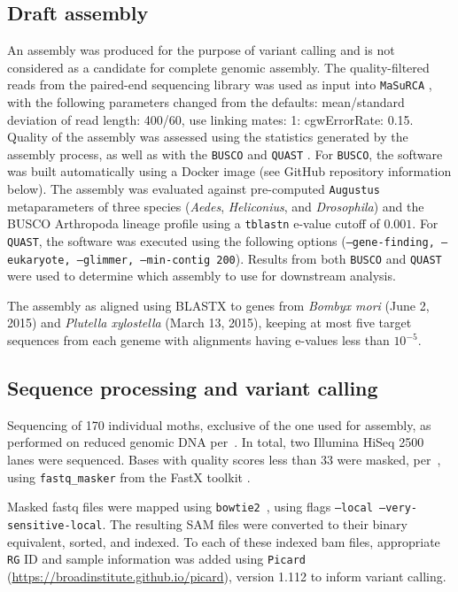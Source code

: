 \documentclass[smallextended]{svjour3}
\begin{document}
\subsection*{Draft assembly}

An assembly was produced for the purpose of variant calling and is not
considered as a candidate for complete genomic assembly. The quality-filtered
reads from the paired-end sequencing library was used as input into
\texttt{MaSuRCA} \citep[][versions 2.3.2, 3.1.3]{Zimin:2013kn}, with the
following parameters changed from the defaults: mean/standard deviation of read
length: 400/60, use linking mates: 1: cgwErrorRate: 0.15.  Quality of the
assembly was assessed using the statistics generated by the assembly process, as
well as with the \texttt{BUSCO} \citep[][version 1.1b1]{Simao:2015kk} and
\texttt{QUAST} \citep[][version 3.2]{Gurevich:2013je}. For \texttt{BUSCO}, the
software was built automatically using a Docker image (see GitHub repository
information below). The assembly was evaluated against pre-computed
\texttt{Augustus} \citep{Stanke:2003eo} metaparameters of three species
(\textit{Aedes}, \textit{Heliconius}, and \textit{Drosophila}) and the BUSCO
Arthropoda lineage profile using a \texttt{tblastn} e-value cutoff of $0.001$.
For \texttt{QUAST}, the software was executed using the following options
(\texttt{--gene-finding, --eukaryote, --glimmer, --min-contig 200}).  Results
from both \texttt{BUSCO} and \texttt{QUAST} were used to determine which
assembly to use for downstream analysis.

The assembly as aligned using BLASTX \citep[][version 2.2.30+]{Camacho:2009fc}
to genes from \textit{Bombyx mori} (June 2, 2015) and  \textit{Plutella
xylostella} (March 13, 2015), keeping at most five target sequences from each
geneme with alignments having e-values less than $10^{-5}$.


\subsection*{Sequence processing and variant calling} Sequencing of 170
individual moths, exclusive of the one used for assembly,  as performed on
reduced genomic DNA per~\cite{PARCHMAN:2012ca}. In total, two Illumina HiSeq
2500 lanes were sequenced. Bases with quality scores less than 33 were masked,
per~\cite{Yun:2014dn},  using \texttt{fastq\_masker} from the FastX toolkit
\citep[][version 0.0.14]{citeulike:9103573}.

Masked fastq files were mapped using \texttt{bowtie2}~\citep[][version
2.2.4]{Langmead:2012jh}, using flags  \texttt{--local --very-sensitive-local}.
The resulting  SAM files were converted to their binary equivalent, sorted,
and indexed. To each of these indexed bam files, appropriate \texttt{RG} ID and
sample information was added using \texttt{Picard} \\
(\url{https://broadinstitute.github.io/picard}), version 1.112 to inform variant
calling.
\end{document}
